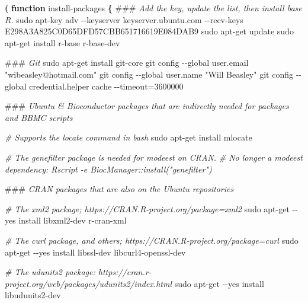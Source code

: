 \documentclass[
]{book}
\newenvironment{Shaded}{\begin{snugshade}}{\end{snugshade}}
\newcommand{\AlertTok}[1]{\textcolor[rgb]{0.94,0.16,0.16}{#1}}
\newcommand{\CommentTok}[1]{\textcolor[rgb]{0.56,0.35,0.01}{\textit{#1}}}
\newcommand{\FunctionTok}[1]{\textcolor[rgb]{0.00,0.00,0.00}{#1}}
\newcommand{\KeywordTok}[1]{\textcolor[rgb]{0.13,0.29,0.53}{\textbf{#1}}}
\newcommand{\NormalTok}[1]{#1}
\newcommand{\StringTok}[1]{\textcolor[rgb]{0.31,0.60,0.02}{#1}}
\begin{document}
\begin{Shaded}
\begin{Highlighting}[]
\KeywordTok{(} \KeywordTok{function}\FunctionTok{ install{-}packages} \KeywordTok{\{}
  \AlertTok{\#\#\#}\CommentTok{ Add the key, update the list, then install base R.}
  \FunctionTok{sudo}\NormalTok{ apt{-}key adv {-}{-}keyserver keyserver.ubuntu.com {-}{-}recv{-}keys E298A3A825C0D65DFD57CBB651716619E084DAB9}
  \FunctionTok{sudo}\NormalTok{ apt{-}get update}
  \FunctionTok{sudo}\NormalTok{ apt{-}get install r{-}base r{-}base{-}dev}

  \AlertTok{\#\#\#}\CommentTok{ Git}
  \FunctionTok{sudo}\NormalTok{ apt{-}get install git{-}core}
  \FunctionTok{git}\NormalTok{ config {-}{-}global user.email }\StringTok{"wibeasley@hotmail.com"}
  \FunctionTok{git}\NormalTok{ config {-}{-}global user.name }\StringTok{"Will Beasley"}
  \FunctionTok{git}\NormalTok{ config {-}{-}global credential.helper }\StringTok{\textquotesingle{}cache {-}{-}timeout=3600000\textquotesingle{}}

  \AlertTok{\#\#\#}\CommentTok{ Ubuntu \& Bioconductor packages that are indirectly needed for packages and BBMC scripts}

  \CommentTok{\# Supports the \textasciigrave{}locate\textasciigrave{} command in bash}
  \FunctionTok{sudo}\NormalTok{ apt{-}get install mlocate}

  \CommentTok{\# The genefilter package is needed for \textquotesingle{}modeest\textquotesingle{} on CRAN.}
  \CommentTok{\# No longer a modeest dependency: Rscript {-}e \textquotesingle{}BiocManager::install("genefilter")\textquotesingle{}}

  \AlertTok{\#\#\#}\CommentTok{ CRAN packages that are also on the Ubuntu repositories}

  \CommentTok{\# The \textquotesingle{}xml2\textquotesingle{} package; https://CRAN.R{-}project.org/package=xml2}
  \FunctionTok{sudo}\NormalTok{ apt{-}get {-}{-}yes install libxml2{-}dev r{-}cran{-}xml}

  \CommentTok{\# The \textquotesingle{}curl\textquotesingle{} package, and others; https://CRAN.R{-}project.org/package=curl}
  \FunctionTok{sudo}\NormalTok{ apt{-}get {-}{-}yes install libssl{-}dev libcurl4{-}openssl{-}dev}

  \CommentTok{\# The \textquotesingle{}udunits2\textquotesingle{} package: https://cran.r{-}project.org/web/packages/udunits2/index.html}
  \FunctionTok{sudo}\NormalTok{ apt{-}get {-}{-}yes install libudunits2{-}dev}


\end{Highlighting}
\end{Shaded}
\end{document}
